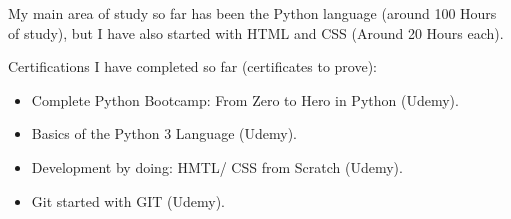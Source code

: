 \smallskip\smallskip
\par{
  My main area of study so far
  has been the Python language
  (around 100 Hours of study),
  but I have also started with
  HTML and CSS (Around 20
  Hours each).
}
\par{Certifications I have completed so far (certificates to prove):}
\begin{itemize}
  \item Complete Python Bootcamp: From Zero to Hero in Python (Udemy).
  \item Basics of the Python 3 Language (Udemy).
  \item Development by doing: HMTL/ CSS from Scratch (Udemy).
  \item Git started with GIT (Udemy).
  \\
\end{itemize}
